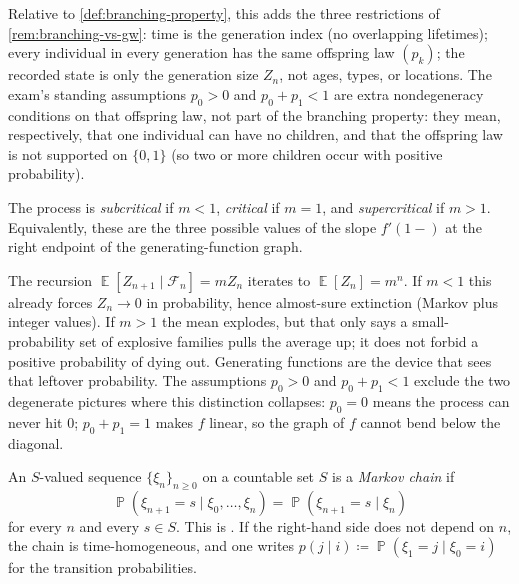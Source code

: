 \documentclass[11pt,a4paper]{article}
\DeclareMathOperator{\E}{\mathbb{E}}
\DeclareMathOperator{\Pbb}{\mathbb{P}}
\begin{document}
Relative to \cref{def:branching-property}, this adds the three restrictions of \cref{rem:branching-vs-gw}: time is the generation index (no overlapping lifetimes); every individual in every generation has the same offspring law \((p_k)\); the recorded state is only the generation size \(Z_n\), not ages, types, or locations. The exam's standing assumptions \(p_0>0\) and \(p_0+p_1<1\) are extra nondegeneracy conditions on that offspring law, not part of the branching property: they mean, respectively, that one individual can have no children, and that the offspring law is not supported on \(\{0,1\}\) (so two or more children occur with positive probability).

\begin{definition}[Criticality]
\label{def:criticality}
The process is \emph{subcritical} if \(m<1\), \emph{critical} if \(m=1\), and \emph{supercritical} if \(m>1\). Equivalently, these are the three possible values of the slope \(f'(1-)\) at the right endpoint of the generating-function graph.
\end{definition}

\begin{remark}
\label{rem:mean-vs-extinction}
The recursion \(\E[Z_{n+1}\mid\mathcal{F}_n]=mZ_n\) iterates to \(\E[Z_n]=m^n\). If \(m<1\) this already forces \(Z_n\to 0\) in probability, hence almost-sure extinction (Markov plus integer values). If \(m>1\) the mean explodes, but that only says a small-probability set of explosive families pulls the average up; it does not forbid a positive probability of dying out. Generating functions are the device that sees that leftover probability. The assumptions \(p_0>0\) and \(p_0+p_1<1\) exclude the two degenerate pictures where this distinction collapses: \(p_0=0\) means the process can never hit \(0\); \(p_0+p_1=1\) makes \(f\) linear, so the graph of \(f\) cannot bend below the diagonal.
\end{remark}

\begin{definition}
\label{def:markov-chain-brz}
An \(S\)-valued sequence \(\{\xi_n\}_{n\ge 0}\) on a countable set \(S\) is a \emph{Markov chain} if
\[
\Pbb(\xi_{n+1}=s\mid \xi_0,\dots,\xi_n)
=
\Pbb(\xi_{n+1}=s\mid \xi_n)
\]
for every \(n\) and every \(s\in S\). This is \citep[Definition~5.1, (5.10)]{brzezniak1999}. If the right-hand side does not depend on \(n\), the chain is time-homogeneous, and one writes \(p(j\mid i)\coloneqq\Pbb(\xi_1=j\mid \xi_0=i)\) for the transition probabilities.
\end{definition}
\end{document}
